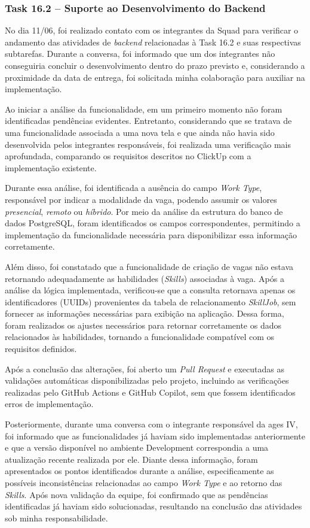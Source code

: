 \subsubsection*{Task 16.2 -- Suporte ao Desenvolvimento do Backend}

No dia 11/06, foi realizado contato com os integrantes da Squad para verificar o
andamento das atividades de \textit{backend} relacionadas à Task 16.2 e suas
respectivas subtarefas. Durante a conversa, foi informado que um dos integrantes não
conseguiria concluir o desenvolvimento dentro do prazo previsto e, considerando a
proximidade da data de entrega, foi solicitada minha colaboração para auxiliar na
implementação.

Ao iniciar a análise da funcionalidade, em um primeiro momento não foram identificadas
pendências evidentes. Entretanto, considerando que se tratava de uma funcionalidade
associada a uma nova tela e que ainda não havia sido desenvolvida pelos integrantes
responsáveis, foi realizada uma verificação mais aprofundada, comparando os requisitos
descritos no ClickUp com a implementação existente.

Durante essa análise, foi identificada a ausência do campo \textit{Work Type},
responsável por indicar a modalidade da vaga, podendo assumir os valores
\textit{presencial}, \textit{remoto} ou \textit{híbrido}. Por meio da análise da
estrutura do banco de dados PostgreSQL, foram identificados os campos correspondentes,
permitindo a implementação da funcionalidade necessária para disponibilizar essa
informação corretamente.

Além disso, foi constatado que a funcionalidade de criação de vagas não estava
retornando adequadamente as habilidades (\textit{Skills}) associadas à vaga. Após a
análise da lógica implementada, verificou-se que a consulta retornava apenas os
identificadores (UUIDs) provenientes da tabela de relacionamento \textit{SkillJob},
sem fornecer as informações necessárias para exibição na aplicação. Dessa forma, foram
realizados os ajustes necessários para retornar corretamente os dados relacionados às
habilidades, tornando a funcionalidade compatível com os requisitos definidos.

Após a conclusão das alterações, foi aberto um \textit{Pull Request} e executadas as
validações automáticas disponibilizadas pelo projeto, incluindo as verificações
realizadas pelo GitHub Actions e GitHub Copilot, sem que fossem identificados erros de
implementação.

Posteriormente, durante uma conversa com o integrante responsável da \ac{ages} IV,
foi informado que as funcionalidades já haviam sido implementadas anteriormente e que
a versão disponível no ambiente Development correspondia a uma atualização recente
realizada por ele. Diante dessa informação, foram apresentados os pontos identificados
durante a análise, especificamente as possíveis inconsistências relacionadas ao campo
\textit{Work Type} e ao retorno das \textit{Skills}. Após nova validação da equipe,
foi confirmado que as pendências identificadas já haviam sido solucionadas, resultando
na conclusão das atividades sob minha responsabilidade.

